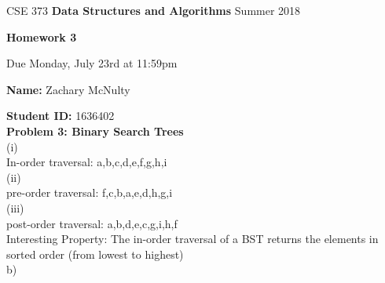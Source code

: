 \documentclass[12pt,a4paper]{article}
\begin{document}
%
%
\begin{center}
CSE 373    \hspace{0.4 cm}  
{\bf Data Structures and Algorithms }
  \hspace{0.4 cm}   Summer 2018
\end{center} 
\vspace{-7 mm}
\noindent \hrulefill
\vspace{3 mm}


%
%

\begin{center}
{\bf \Large Homework 3}

Due Monday, July 23rd at 11:59pm
\end{center}


{\bf Name:} Zachary McNulty

{\bf Student ID:} 1636402\\

%
%

{\bf\large Problem 3: Binary Search Trees}\\

(i) \\
In-order traversal: a,b,c,d,e,f,g,h,i \\

(ii)\\
pre-order traversal: f,c,b,a,e,d,h,g,i\\

(iii)\\
post-order traversal: a,b,d,e,c,g,i,h,f\\

Interesting Property: The in-order traversal of a BST returns the elements in sorted order (from lowest to highest)\\

b) \\
\end{document}
